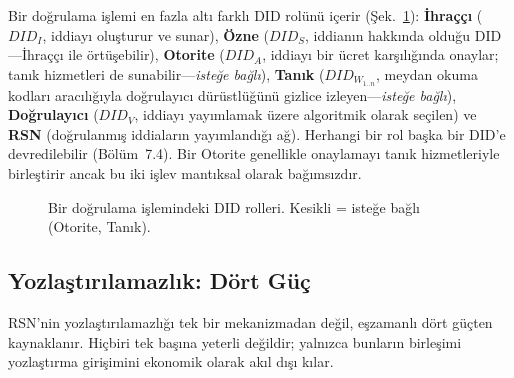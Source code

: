 \documentclass[11pt,a4paper,twocolumn]{article}
\begin{document}
Bir doğrulama işlemi en fazla altı farklı DID rolünü içerir (Şek.~\ref{fig:roles}): \textbf{İhraççı} ($DID_I$, iddiayı oluşturur ve sunar), \textbf{Özne} ($DID_S$, iddianın hakkında olduğu DID---İhraççı ile örtüşebilir), \textbf{Otorite} ($DID_A$, iddiayı bir ücret karşılığında onaylar; tanık hizmetleri de sunabilir---\emph{isteğe bağlı}), \textbf{Tanık} ($DID_{W_{1..n}}$, meydan okuma kodları aracılığıyla doğrulayıcı dürüstlüğünü gizlice izleyen---\emph{isteğe bağlı}), \textbf{Doğrulayıcı} ($DID_V$, iddiayı yayımlamak üzere algoritmik olarak seçilen) ve \textbf{RSN} (doğrulanmış iddiaların yayımlandığı ağ). Herhangi bir rol başka bir DID'e devredilebilir (Bölüm~7.4). Bir Otorite genellikle onaylamayı tanık hizmetleriyle birleştirir ancak bu iki işlev mantıksal olarak bağımsızdır.

\begin{figure}[ht]
\centering
{}
\caption{Bir doğrulama işlemindeki DID rolleri. Kesikli = isteğe bağlı (Otorite, Tanık).}
\label{fig:roles}
\end{figure}

\subsection{Yozlaştırılamazlık: Dört Güç}

RSN'nin yozlaştırılamazlığı tek bir mekanizmadan değil, eşzamanlı dört güçten kaynaklanır. Hiçbiri tek başına yeterli değildir; yalnızca bunların birleşimi yozlaştırma girişimini ekonomik olarak akıl dışı kılar.
\end{document}
